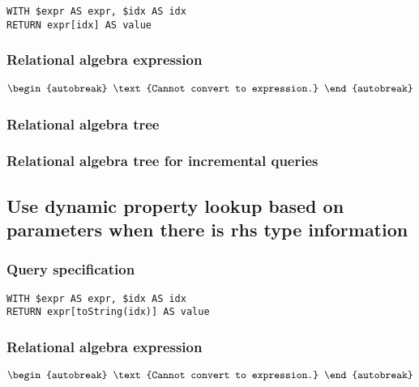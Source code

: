 \begin{lstlisting}
WITH $expr AS expr, $idx AS idx
RETURN expr[idx] AS value
\end{lstlisting}

\subsubsection*{Relational algebra expression}

\begin{align*}
\begin{autobreak}
\text{Cannot convert to expression.}
\end{autobreak}
\end{align*}

\subsubsection*{Relational algebra tree}


\subsubsection*{Relational algebra tree for incremental queries}


\subsection{Use dynamic property lookup based on parameters when there is rhs type information}

\subsubsection*{Query specification}

\begin{lstlisting}
WITH $expr AS expr, $idx AS idx
RETURN expr[toString(idx)] AS value
\end{lstlisting}

\subsubsection*{Relational algebra expression}

\begin{align*}
\begin{autobreak}
\text{Cannot convert to expression.}
\end{autobreak}
\end{align*}

